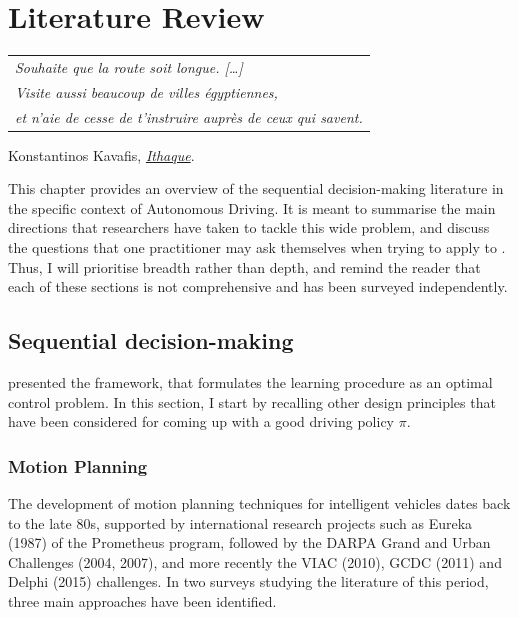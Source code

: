 
\graphicspath{{2-Chapters/2-Chapter/}}

\chapter{Literature Review}
\label{chapter:2}

\begin{flushright}
	\begin{tabular}{@{}l@{}}
		\emph{Souhaite que la route soit longue. [\dots]}\\
		\emph{Visite aussi beaucoup de villes égyptiennes,}\\
		\emph{et n’aie de cesse de t’instruire auprès de ceux qui savent.}\\
	\end{tabular}
	
	Konstantinos Kavafis, \href{https://eleurent.github.io/sisyphe/texts/ithaki.html}{\emph{Ithaque}}.
\end{flushright}

\abstractStartChapter{}%
This chapter provides an overview of the sequential decision-making literature in the specific context of Autonomous Driving. It is meant to summarise the main directions that researchers have taken to tackle this wide problem, and discuss the questions that one practitioner may ask themselves when trying to apply  to . Thus, I will prioritise breadth rather than depth, and remind the reader that each of these sections is not comprehensive and has been surveyed independently.
\minitocStartChapter{}

\section{Sequential decision-making}
\label{sec:sequential-decision-making}

 presented the  framework, that formulates the learning procedure as an optimal control problem. In this section, I start by recalling other design principles that have been considered for coming up with a good driving policy $\pi$.

\subsection{Motion Planning}

The development of motion planning techniques for intelligent vehicles dates back to the late 80s, supported by international research projects such as Eureka (1987) of the Prometheus program, followed by the DARPA Grand and Urban Challenges (2004, 2007), and more recently the VIAC (2010), GCDC (2011) and Delphi (2015) challenges. In two surveys \citep{Gonzalez2016,Paden2016} studying the literature of this period, three main approaches have been identified.

